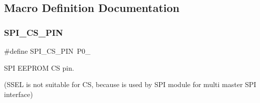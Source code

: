 \subsection{Macro Definition Documentation}
\mbox{\label{group__RTEMSBSPsARMRTL22XX_gad315c5b0bf1d3cd5a38b85b54f45d8a2}} 
\subsubsection{\texorpdfstring{SPI\_CS\_PIN}{SPI\_CS\_PIN}}
{\footnotesize\ttfamily \#define S\+P\+I\+\_\+\+C\+S\+\_\+\+P\+IN~P0\+\_}



S\+PI E\+E\+P\+R\+OM CS pin. 

(S\+S\+EL is not suitable for CS, because is used by S\+PI module for multi master S\+PI interface) 
